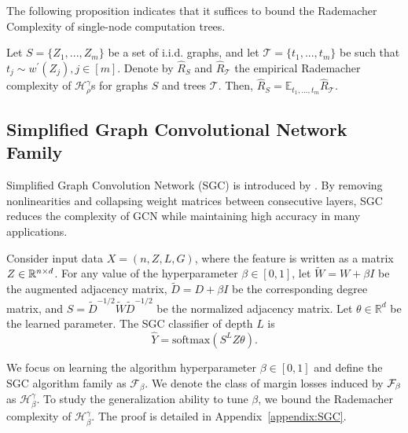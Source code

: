 The following proposition indicates that it suffices to bound the Rademacher Complexity of single-node computation trees. 

\begin{proposition}
    Let $S = \{Z_1, ..., Z_m\}$ be a set of i.i.d. graphs, and let $\mathcal{T} = \{t_1, ..., t_m\}$ be such that $t_j \sim w^\prime (Z_j), j \in [m]$. Denote by $\hat R_{S}$ and $\hat R_{\mathcal{T}}$ the empirical Rademacher complexity of $\mathcal{H}_\rho^\gamma$s for graphs $S$ and trees $\mathcal{T}$. Then, $\hat R_{S} = \mathbb{E}_{t_1, ..., t_m} \hat R_{\mathcal{T}}$.
\end{proposition}

\subsection{Simplified Graph Convolutional Network Family}\label{sec:sgc}

Simplified Graph Convolution Network (SGC) is introduced by \citet{wu19simplifying}. By removing nonlinearities and collapsing weight matrices between consecutive layers, SGC reduces the complexity of GCN while maintaining high accuracy in many applications.

Consider input data $X = (n, Z, L, G)$, where the feature is written as a matrix $Z \in \mathbb{R}^{n \times d}$. For any value of the hyperparameter $\beta \in [0,1]$, let $\tilde{W} = W + \beta I$ be the augmented adjacency matrix, $\tilde{D} = D + \beta I$ be the corresponding degree matrix, and $S = \tilde{D}^{-1/2}\tilde{W}\tilde{D}^{-1/2}$ be the normalized adjacency matrix. Let $\theta \in \mathbb{R}^{d}$ be the learned parameter. The SGC classifier of depth $L$ is
\[\hat Y = \text{softmax}(S^L Z \theta).\]

We focus on learning the algorithm hyperparameter $\beta \in [0,1]$ and define the SGC algorithm family as $\mathcal{F}_{\beta}$. We denote the class of margin losses induced by $\mathcal{F}_\beta$ as $\mathcal{H}_{\beta}^{\gamma}$.
To study the generalization ability to tune $\beta$, we bound the Rademacher complexity of $\mathcal{H}_{\beta}^{\gamma}$. The proof is detailed in Appendix~\ref{appendix:SGC}.

